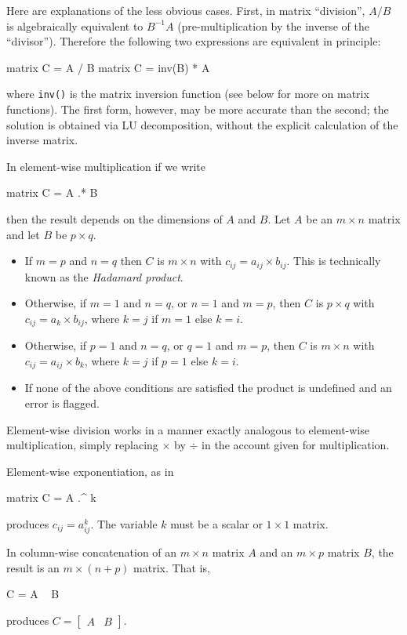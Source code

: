 Here are explanations of the less obvious cases.  First, in matrix
``division'', $A/B$ is algebraically equivalent to $B^{-1}A$
(pre-multiplication by the inverse of the ``divisor'').  Therefore the
following two expressions are equivalent in principle:
%
\begin{code}
matrix C = A / B
matrix C = inv(B) * A
\end{code}
%
where \texttt{inv()} is the matrix inversion function (see below for
more on matrix functions).  The first form, however, may be more
accurate than the second; the solution is obtained via LU
decomposition, without the explicit calculation of the inverse matrix.

In element-wise multiplication if we write
%
\begin{code}
matrix C = A .* B
\end{code}
% 
then the result depends on the dimensions of $A$ and $B$.  Let $A$ be
an $m \times n$ matrix and let $B$ be $p \times q$.  
%
\begin{itemize}
\item If $m=p$ and $n=q$ then $C$ is $m\times n$ with $c_{ij} = a_{ij}
  \times b_{ij}$.  This is technically known as the \emph{Hadamard
    product}.
\item Otherwise, if $m=1$ and $n=q$, or $n=1$ and $m=p$, then $C$ is
  $p\times q$ with $c_{ij} = a_k \times b_{ij}$, where $k=j$ if $m=1$
  else $k=i$.
\item Otherwise, if $p=1$ and $n=q$, or $q=1$ and $m=p$, then $C$ is
  $m\times n$ with $c_{ij} = a_{ij} \times b_k$, where $k=j$ if $p=1$
  else $k=i$.
\item If none of the above conditions are satisfied the product is
  undefined and an error is flagged.
\end{itemize}

Element-wise division works in a manner exactly analogous to
element-wise multiplication, simply replacing $\times$ by $\div$ in
the account given for multiplication.

Element-wise exponentiation, as in 
%
\begin{code}
matrix C = A .^ k
\end{code}
% 
produces $c_{ij} = a_{ij}^k$.  The variable $k$ must be a scalar or
$1\times 1$ matrix.

In column-wise concatenation of an $m\times n$ matrix $A$ and
an $m\times p$ matrix $B$, the result is an $m\times (n+p)$ matrix.
That is,
%
\begin{code}
C = A ~ B
\end{code}
% 
produces $C = \left[ \begin{array}{cc} A & B \end{array} \right]$.

